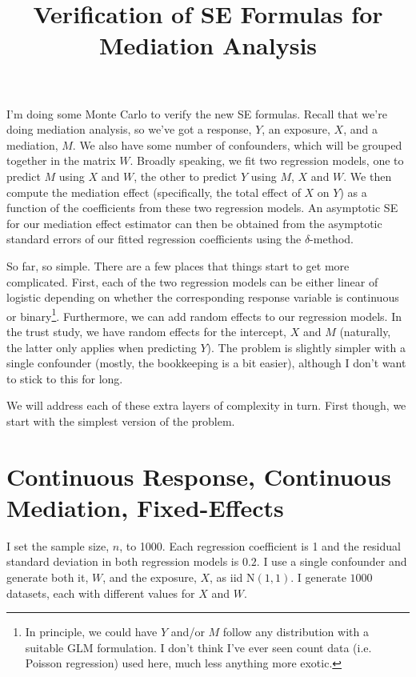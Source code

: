 \documentclass{article}
\title{Verification of SE Formulas for Mediation Analysis}
\begin{document}
\maketitle

I'm doing some Monte Carlo to verify the new SE formulas. Recall that we're doing mediation analysis, so we've got a response, $Y$, an exposure, $X$, and a mediation, $M$. We also have some number of confounders, which will be grouped together in the matrix $W$. Broadly speaking, we fit two regression models, one to predict $M$ using $X$ and $W$, the other to predict $Y$ using $M$, $X$ and $W$. We then compute the mediation effect (specifically, the total effect of $X$ on $Y$) as a function of the coefficients from these two regression models. An asymptotic SE for our mediation effect estimator can then be obtained from the asymptotic standard errors of our fitted regression coefficients using the $\delta$-method.

So far, so simple. There are a few places that things start to get more complicated. First, each of the two regression models can be either linear of logistic depending on whether the corresponding response variable is continuous or binary\footnote{In principle, we could have $Y$ and/or $M$ follow any distribution with a suitable GLM formulation. I don't think I've ever seen count data (i.e. Poisson regression) used here, much less anything more exotic.}. Furthermore, we can add random effects to our regression models. In the trust study, we have random effects for the intercept, $X$ and $M$ (naturally, the latter only applies when predicting $Y$). The problem is slightly simpler with a single confounder (mostly, the bookkeeping is a bit easier), although I don't want to stick to this for long.

We will address each of these extra layers of complexity in turn. First though, we start with the simplest version of the problem. 

\section{Continuous Response, Continuous Mediation, Fixed-Effects}
\label{sec:cont_cont_fix}

I set the sample size, $n$, to 1000. Each regression coefficient is 1 and the residual standard deviation in both regression models is $0.2$. I use a single confounder and generate both it, $W$, and the exposure, $X$, as iid $\mathrm{N}(1,1)$. I generate $1000$ datasets, each with different values for $X$ and $W$. 
\end{document}
